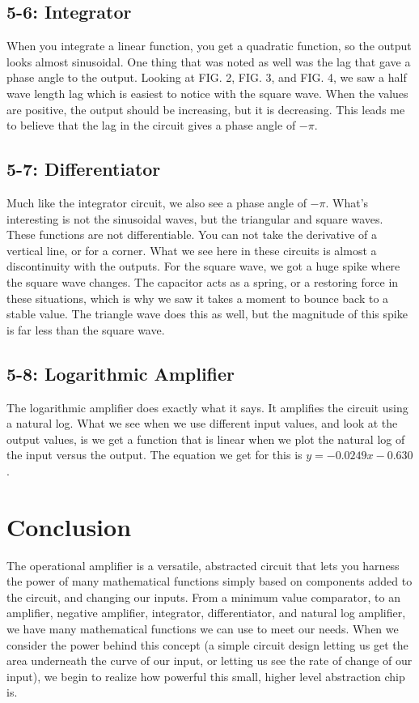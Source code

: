 \documentclass[%
 aip,
 jmp,
 amsmath,
 amssymb,
 reprint,%
 numerical,
 longbibliography,
]{revtex4-1}
\begin{document}
	\subsection{5-6: Integrator}
	
	When you integrate a linear function, you get a quadratic function, so the output looks almost sinusoidal. One thing that was noted as well was the lag that gave a phase angle to 
	the output. Looking at FIG. 2, FIG. 3, and FIG. 4, we saw a half wave length lag which is easiest to notice with the square wave. When the values are positive,
	the output should be increasing, but it is decreasing. This leads me to believe that the lag in the circuit gives a phase angle of $-\pi$. 
	
	\subsection{5-7: Differentiator}
	
	Much like the integrator circuit, we also see a phase angle of $-\pi$. What's interesting is not the sinusoidal waves, but the triangular and square waves.
	These functions are not differentiable. You can not take the derivative of a vertical line, or for a corner. What we see here in these circuits is almost a
	discontinuity with the outputs. For the square wave, we got a huge spike where the square wave changes. The capacitor acts as a spring, or a restoring force
	in these situations, which is why we saw it takes a moment to bounce back to a stable value. The triangle wave does this as well, but the magnitude of this
	spike is far less than the square wave.
	
	\subsection{5-8: Logarithmic Amplifier}
	
	The logarithmic amplifier does exactly what it says. It amplifies the circuit using a natural log. What we see when we use different input values, and look
	at the output values, is we get a function that is linear when we plot the natural log of the input versus the output. The equation we get for this is
	$y = -0.0249x - 0.630$.

\section{Conclusion}

The operational amplifier is a versatile, abstracted circuit that lets you harness the power of many mathematical functions simply based on components added to the circuit,
and changing our inputs. From a minimum value comparator, to an amplifier, negative amplifier, integrator, differentiator, and natural log amplifier, we have many mathematical
functions we can use to meet our needs. When we consider the power behind this concept (a simple circuit design letting us get the area underneath the curve of our input,
or letting us see the rate of change of our input), we begin to realize how powerful this small, higher level abstraction chip is.
\end{document}
